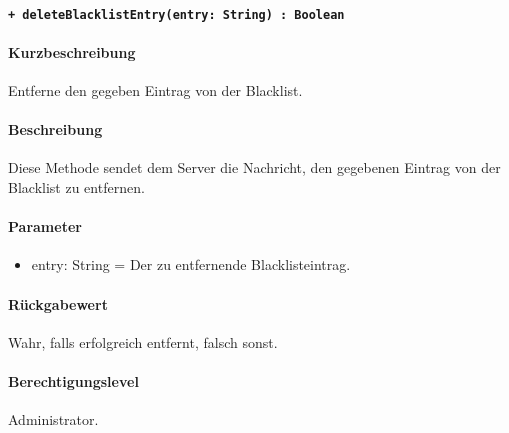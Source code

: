 \paragraph{\texttt{+ deleteBlacklistEntry(entry: String) : Boolean}}\label{AP_Backend_deleteBlacklistEntry}%
\paragraph*{Kurzbeschreibung}
Entferne den gegeben Eintrag von der Blacklist.
\paragraph*{Beschreibung}
Diese Methode sendet dem Server die Nachricht, den gegebenen Eintrag von der Blacklist zu entfernen.
\paragraph*{Parameter}
\begin{itemize}
    \item entry: String = Der zu entfernende Blacklisteintrag.
\end{itemize}
\paragraph*{Rückgabewert}
Wahr, falls erfolgreich entfernt, falsch sonst.
\paragraph*{Berechtigungslevel}
Administrator.